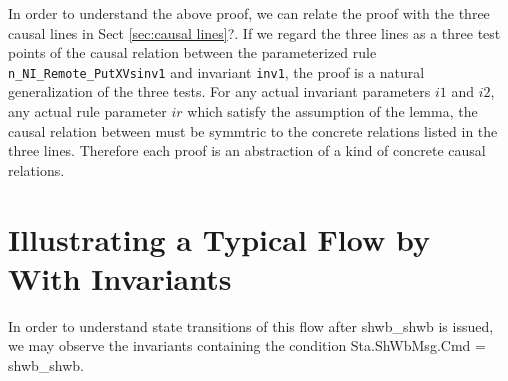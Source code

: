 \documentclass{llncs}
\begin{document}
In order to understand the above proof, we can relate the proof with the three causal lines in Sect \ref{sec:causal lines}?.  If we regard the three lines  as a three test points of the causal relation between the parameterized rule {\tt  n\_NI\_Remote\_PutXVsinv1} and invariant {\tt inv1}, the proof is a natural generalization of the three tests. For any actual invariant parameters $i1$ and $i2$, any actual rule parameter $ir$ which satisfy the assumption of the lemma, the causal relation between  must be symmtric to the concrete relations listed in the three lines. Therefore each proof is an abstraction of a kind of concrete causal relations.
\section{Illustrating a Typical Flow by With Invariants\label{sec:relatingWithFlow}}


In order to understand state transitions of this flow after shwb\_shwb is issued, we may observe the invariants containing the condition Sta.ShWbMsg.Cmd = shwb\_shwb.
\end{document}
